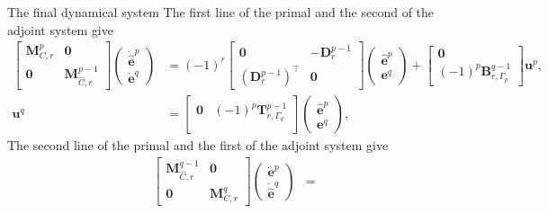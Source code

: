 \documentclass[aspectratio=169]{beamer}
\newcommand*{\dual}[1]{\ensuremath{\widehat{#1}}}
\begin{document}
\begin{frame}{The final dynamical system}
	The first line of the primal  and the second of the adjoint system give
		\begin{equation*}
		\begin{aligned}
			\begin{bmatrix}
				\mathbf{M}^p_{C, r} & \mathbf{0} \\
				\mathbf{0} & \mathbf{M}^{p-1}_{\dual{C}, r}
			\end{bmatrix}
			\begin{pmatrix}
				\dot{\dual{\mathbf{e}}}^p \\
				\dot{\mathbf{e}}^q
			\end{pmatrix} &= (-1)^r
			\begin{bmatrix}
				\mathbf{0} & -\mathbf{D}^{p-1}_r \\
				(\mathbf{D}_r^{p-1})^\top & \mathbf{0}
			\end{bmatrix}
			\begin{pmatrix}
				\dual{\mathbf{e}}^p \\
				\mathbf{e}^q
			\end{pmatrix} +
			\begin{bmatrix}
				\mathbf{0}\\
				(-1)^{p}\mathbf{B}^{q-1}_{r, \Gamma_p}
			\end{bmatrix}
			\mathbf{u}^p, \\
			\mathbf{u}^q &= 
			\begin{bmatrix}
				\mathbf{0} & (-1)^p\mathbf{T}^{p-1}_{r, \Gamma_q} \\
			\end{bmatrix}
			\begin{pmatrix}
				\dual{\mathbf{e}}^p \\
				\mathbf{e}^q
			\end{pmatrix},
		\end{aligned}
	\end{equation*}
	The second line of the primal and the first of the adjoint system give
	\begin{equation*}
		\begin{aligned}
			\begin{bmatrix}
				\mathbf{M}^{q-1}_{\dual{C}, r} & \mathbf{0} \\
				\mathbf{0} & \mathbf{M}^q_{C, r}
			\end{bmatrix}
			\begin{pmatrix}
				\dot{\mathbf{e}}^p \\
				\dot{\dual{\mathbf{e}}}^q
			\end{pmatrix} &= 

\end{aligned}
\end{equation*}
\end{frame}
\end{document}
